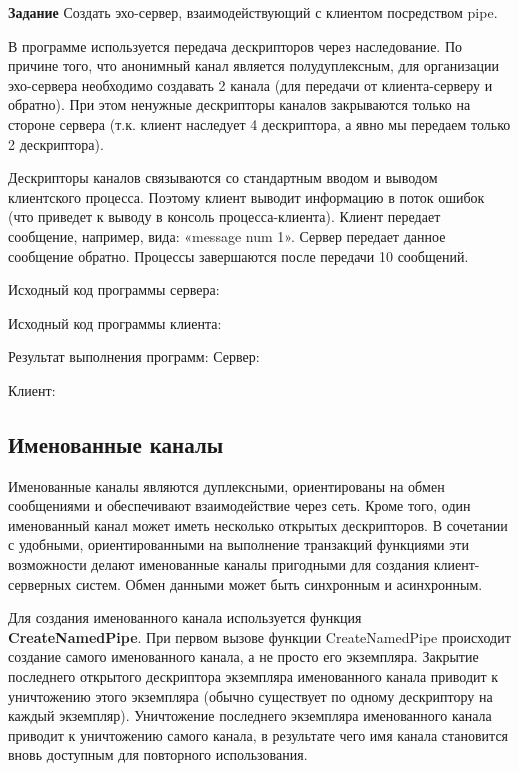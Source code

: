 \documentclass[a4paper]{article}
\begin{document}
	\textbf{Задание} Создать эхо-сервер, взаимодействующий с клиентом посредством pipe.
	
	В программе используется передача дескрипторов через наследование. По причине того, что анонимный канал является полудуплексным, для организации эхо-сервера необходимо создавать 2 канала (для передачи от клиента-серверу и обратно). При этом ненужные дескрипторы каналов закрываются только на стороне сервера (т.к. клиент наследует 4 дескриптора, а явно мы передаем только 2 дескриптора).
	
	Дескрипторы каналов связываются со стандартным вводом и выводом клиентского процесса. Поэтому клиент выводит информацию в поток ошибок (что приведет к выводу в консоль процесса-клиента).
Клиент передает сообщение, например, вида: «message num 1». Сервер передает данное сообщение обратно. Процессы завершаются после передачи 10 сообщений.

	Исходный код программы сервера:
	
	
	
	Исходный код программы клиента:
	
	
	Результат выполнения программ:
	Сервер:
	
	Клиент:
	

	
\subsection{Именованные каналы}
	Именованные каналы являются дуплексными, ориентированы на обмен сообщениями и обеспечивают взаимодействие через сеть. Кроме того, один именованный канал может иметь несколько открытых дескрипторов. В сочетании с удобными, ориентированными на выполнение транзакций функциями эти возможности делают именованные каналы пригодными для создания клиент-серверных систем. Обмен данными может быть синхронным и асинхронным.
	
	Для создания именованного канала используется функция\\ \textbf{CreateNamedPipe}. При первом вызове функции CreateNamedPipe происходит создание самого именованного канала, а не просто его экземпляра. Закрытие последнего открытого дескриптора экземпляра именованного канала приводит к уничтожению этого экземпляра (обычно существует по одному дескриптору на каждый экземпляр). Уничтожение последнего экземпляра именованного канала приводит к уничтожению самого канала, в результате чего имя канала становится вновь доступным для повторного использования.
	
\end{document}
